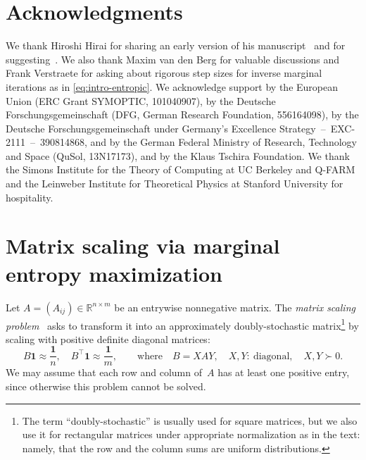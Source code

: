 \documentclass[11pt,letterpaper]{article}
\numberwithin{equation}{section}
\newcommand{\RR}{\mathbb{R}}
\begin{document}
\section*{Acknowledgments}
We thank Hiroshi Hirai for sharing an early version of his manuscript~\cite{Hirai2025} and for suggesting~\cite{Nesterov-smoothing}.
We also thank Maxim van den Berg for valuable discussions and Frank Verstraete for asking about rigorous step sizes for inverse marginal iterations as in \cref{eq:intro-entropic}.
We acknowledge support by the European Union (ERC Grant SYMOPTIC, 101040907), by the Deutsche Forschungsgemeinschaft (DFG, German Research Foundation, 556164098), by the Deutsche Forschungsgemeinschaft under Germany's Excellence Strategy~--~EXC-2111~--~390814868, and by the German Federal Ministry of Research, Technology and Space (QuSol, 13N17173), and by the Klaus Tschira Foundation.
We thank the Simons Institute for the Theory of Computing at UC Berkeley and Q-FARM and the Leinweber Institute for Theoretical Physics at Stanford University for hospitality.

\appendix
{}

\section{Matrix scaling via marginal entropy maximization}\label{app:matrix scaling}
Let $A = (A_{ij}) \in \RR^{n \times m}$ be an entrywise nonnegative matrix.
The \emph{matrix scaling problem}~\cite{Sinkhorn1964,Idel2016} asks to transform it into an approximately doubly-stochastic matrix\footnote{The term ``doubly-stochastic'' is usually used for square matrices, but we also use it for rectangular matrices under appropriate normalization as in the text: namely, that the row and the column sums are uniform distributions.} by scaling with positive definite diagonal matrices:
\begin{equation}\label{eq:matrix scaling goal}
    B\bm{1} \approx \frac{\bm{1}}n, \quad B^\top\bm{1}\approx \frac{\bm{1}}m,\qquad \text{where}\quad B = XAY, \quad X, Y:\ \text{diagonal},\quad X, Y \succ 0.
\end{equation}
We may assume that each row and column of~$A$ has at least one positive entry, since otherwise this problem cannot be solved.
\end{document}

